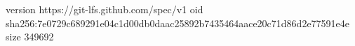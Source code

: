 version https://git-lfs.github.com/spec/v1
oid sha256:7e0729c689291e04c1d00db0daac25892b7435464aace20c71d86d2e77591e4e
size 349692
